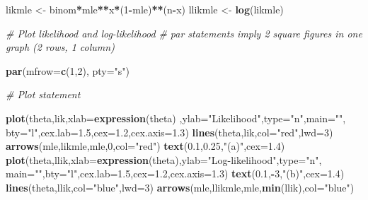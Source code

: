 \documentclass[
]{article}
\newenvironment{Shaded}{\begin{snugshade}}{\end{snugshade}}
\newcommand{\CommentTok}[1]{\textcolor[rgb]{0.56,0.35,0.01}{\textit{#1}}}
\newcommand{\DataTypeTok}[1]{\textcolor[rgb]{0.13,0.29,0.53}{#1}}
\newcommand{\DecValTok}[1]{\textcolor[rgb]{0.00,0.00,0.81}{#1}}
\newcommand{\FloatTok}[1]{\textcolor[rgb]{0.00,0.00,0.81}{#1}}
\newcommand{\KeywordTok}[1]{\textcolor[rgb]{0.13,0.29,0.53}{\textbf{#1}}}
\newcommand{\NormalTok}[1]{#1}
\newcommand{\OperatorTok}[1]{\textcolor[rgb]{0.81,0.36,0.00}{\textbf{#1}}}
\newcommand{\StringTok}[1]{\textcolor[rgb]{0.31,0.60,0.02}{#1}}
\begin{document}
\begin{Shaded}
\begin{Highlighting}[]
\NormalTok{likmle <-}\StringTok{ }\NormalTok{binom}\OperatorTok{*}\NormalTok{mle}\OperatorTok{**}\NormalTok{x}\OperatorTok{*}\NormalTok{(}\DecValTok{1}\OperatorTok{-}\NormalTok{mle)}\OperatorTok{**}\NormalTok{(n}\OperatorTok{-}\NormalTok{x)}
\NormalTok{llikmle <-}\StringTok{ }\KeywordTok{log}\NormalTok{(likmle)}

\CommentTok{# Plot likelihood and log-likelihood}
\CommentTok{# par statements imply 2 square figures in one graph (2 rows, 1 column)}

\KeywordTok{par}\NormalTok{(}\DataTypeTok{mfrow=}\KeywordTok{c}\NormalTok{(}\DecValTok{1}\NormalTok{,}\DecValTok{2}\NormalTok{), }\DataTypeTok{pty=}\StringTok{"s"}\NormalTok{)}

\CommentTok{# Plot statement}

\KeywordTok{plot}\NormalTok{(theta,lik,}\DataTypeTok{xlab=}\KeywordTok{expression}\NormalTok{(theta) ,}\DataTypeTok{ylab=}\StringTok{"Likelihood"}\NormalTok{,}\DataTypeTok{type=}\StringTok{"n"}\NormalTok{,}\DataTypeTok{main=}\StringTok{""}\NormalTok{,}
\DataTypeTok{bty=}\StringTok{"l"}\NormalTok{,}\DataTypeTok{cex.lab=}\FloatTok{1.5}\NormalTok{,}\DataTypeTok{cex=}\FloatTok{1.2}\NormalTok{,}\DataTypeTok{cex.axis=}\FloatTok{1.3}\NormalTok{)}
\KeywordTok{lines}\NormalTok{(theta,lik,}\DataTypeTok{col=}\StringTok{"red"}\NormalTok{,}\DataTypeTok{lwd=}\DecValTok{3}\NormalTok{)}
\KeywordTok{arrows}\NormalTok{(mle,likmle,mle,}\DecValTok{0}\NormalTok{,}\DataTypeTok{col=}\StringTok{"red"}\NormalTok{)}
\KeywordTok{text}\NormalTok{(}\FloatTok{0.1}\NormalTok{,}\FloatTok{0.25}\NormalTok{,}\StringTok{"(a)"}\NormalTok{,}\DataTypeTok{cex=}\FloatTok{1.4}\NormalTok{)}
\KeywordTok{plot}\NormalTok{(theta,llik,}\DataTypeTok{xlab=}\KeywordTok{expression}\NormalTok{(theta),}\DataTypeTok{ylab=}\StringTok{"Log-likelihood"}\NormalTok{,}\DataTypeTok{type=}\StringTok{"n"}\NormalTok{,}
\DataTypeTok{main=}\StringTok{""}\NormalTok{,}\DataTypeTok{bty=}\StringTok{"l"}\NormalTok{,}\DataTypeTok{cex.lab=}\FloatTok{1.5}\NormalTok{,}\DataTypeTok{cex=}\FloatTok{1.2}\NormalTok{,}\DataTypeTok{cex.axis=}\FloatTok{1.3}\NormalTok{)}
\KeywordTok{text}\NormalTok{(}\FloatTok{0.1}\NormalTok{,}\OperatorTok{-}\DecValTok{3}\NormalTok{,}\StringTok{"(b)"}\NormalTok{,}\DataTypeTok{cex=}\FloatTok{1.4}\NormalTok{)}
\KeywordTok{lines}\NormalTok{(theta,llik,}\DataTypeTok{col=}\StringTok{"blue"}\NormalTok{,}\DataTypeTok{lwd=}\DecValTok{3}\NormalTok{)}
\KeywordTok{arrows}\NormalTok{(mle,llikmle,mle,}\KeywordTok{min}\NormalTok{(llik),}\DataTypeTok{col=}\StringTok{"blue"}\NormalTok{)}
\end{Highlighting}
\end{Shaded}
\end{document}
